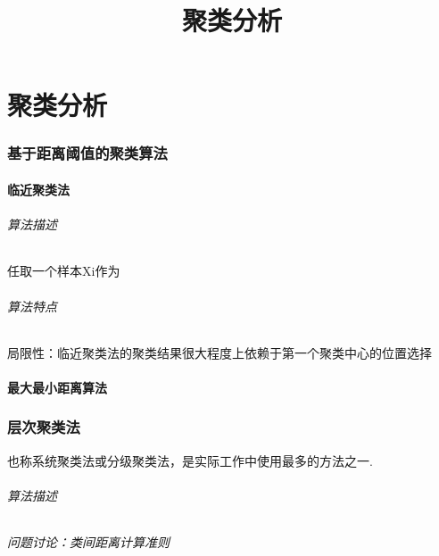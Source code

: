 \documentclass[UTF8]{article}
\title{聚类分析}
\begin{document}
\part{聚类分析}

\section{基于距离阈值的聚类算法}

\subsection{临近聚类法}

\paragraph{算法描述}
\subparagraph{任取一个样本Xi作为}	

\paragraph{算法特点}
\subparagraph{局限性：临近聚类法的聚类结果很大程度上依赖于第一个聚类中心的位置选择}

\subsection{最大最小距离算法}


\section{层次聚类法}

也称系统聚类法或分级聚类法，是实际工作中使用最多的方法之一.

\paragraph{算法描述}

\paragraph{问题讨论：类间距离计算准则}
\end{document}
